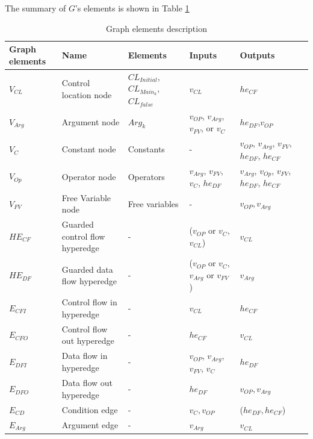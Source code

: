 \documentclass{article}
\begin{document}
The summary of $G$'s elements is shown in Table \ref{GraphDescription}
\begin{table}\caption{Graph elements description} \label{GraphDescription} 
\begin{center}
\begin{tabular}{lp{3cm}p{3cm}p{3cm}p{3cm}p{3cm}}
\hline
Graph elements & Name & Elements & Inputs & Outputs \\
\hline
$V_{CL}$  & Control location node            & $CL_{Initial}$, $CL_{Main_{k}}$, $CL_{false}$   & $v_{CL}$ & $he_{CF}$\\
$V_{Arg}$ & Argument node                    & $Arg_{k}$                               &  $v_{OP}$, $v_{Arg}$, $v_{FV}$, or $v_{C}$ & $he_{DF}$,$v_{OP}$\\
$V_{C}$   & Constant node                    & Constants                               & - & $v_{OP}$, $v_{Arg}$, $v_{FV}$, $he_{DF}$, $he_{CF}$\\
$V_{Op}$  & Operator node                    & Operators                               & $v_{Arg}$, $v_{FV}$, $v_{C}$, $he_{DF}$ &$v_{Arg}$, $v_{Op}$, $v_{FV}$, $he_{DF}$, $he_{CF}$\\
$V_{FV}$  & Free Variable node               & Free variables                          & -  & $v_{OP},v_{Arg}$\\
$HE_{CF}$ & Guarded control flow hyperedge   & -                                       & ($v_{OP}$ or $v_{C}$, $v_{CL}$) & $v_{CL}$\\
$HE_{DF}$ & Guarded data flow hyperedge      & -                                       & ($v_{OP}$ or $v_{C}$, $v_{Arg}$ or $v_{FV}$) & $v_{Arg}$\\
$E_{CFI}$ & Control flow in hyperedge             & -                                       & $v_{CL}$                                  & $he_{CF}$\\
$E_{CFO}$ & Control flow out hyperedge            & -                                       &$he_{CF}$&$v_{CL}$\\
$E_{DFI}$ & Data flow in hyperedge                & -                                       &$v_{OP}$, $v_{Arg}$, $v_{FV}$, $v_{C}$& $he_{DF}$\\
$E_{DFO}$ & Data flow out hyperedge               & -                                       &$he_{DF}$ &$v_{OP},v_{Arg}$\\
$E_{CD}$ &  Condition edge                   & -                                       &$v_{C},v_{OP}$&($he_{DF},he_{CF}$)\\
$E_{Arg}$ & Argument edge                    & -                                       &$v_{Arg}$ & $v_{CL}$\\
\hline
\end{tabular}
\end{center}
\end{table}
\end{document}
